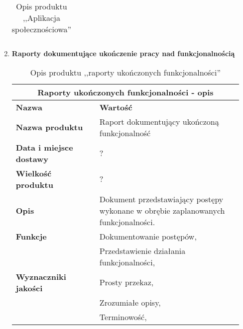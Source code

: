 \documentclass[12pt,a4paper]{article}
\begin{document}
\begin{enumerate}
\begin{table}[htb]
\begin{tabular}{|c|c|}
      \hline
      \end{tabular}
    \caption{Opis produktu ,,Aplikacja społecznościowa''}
    \label{tab:produkt1}
    \end{table}
\newpage
    \item \textbf{Raporty dokumentujące ukończenie pracy nad funkcjonalnością}
    \begin{table}[htb]
    \centering
      \begin{tabular}{|p{0.35\linewidth} | p{0.6\linewidth}|}
      \hline
      \multicolumn{2}{|c|}{Raporty ukończonych funkcjonalności - opis} \\
      \hline
      {\bf Nazwa} & {\bf Wartość} \\
      \hline
      \textbf{Nazwa produktu} & Raport dokumentujący ukończoną funkcjonalność \\
      \hline
      \textbf{Data i miejsce dostawy} & ? \\
      \hline
      \textbf{Wielkość produktu} & ? \\
      \hline
      \textbf{Opis} & Dokument przedstawiający postępy wykonane w obrębie zaplanowanych funkcjonalności.  \\
      \hline
      \textbf{Funkcje} 
                      & Dokumentowanie postępów, \\
                      & Przedstawienie działania funkcjonalności, \\
      
      \hline
      \textbf{Wyznaczniki jakości} 
                      & Prosty przekaz, \\
                      & Zrozumiałe opisy, \\
                      & Terminowość, \\
      
      \hline
      \end{tabular}
    \caption{Opis produktu ,,raporty ukończonych funkcjonalności''}
    \label{tab:produkt2}
    \end{table}


\end{enumerate}
\end{document}
